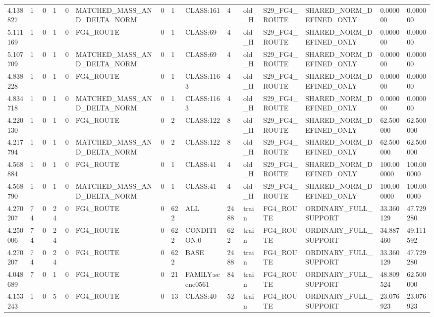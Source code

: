 \begin{tabular}{lllllllllllllll}
4.138827 & 1 & 0 & 1 & 0 & MATCHED\_MASS\_AND\_DELTA\_NORM & 0 & 1 & CLASS:161 & 4 & old\_H & S29\_FG4\_ROUTE & SHARED\_NORM\_DEFINED\_ONLY & 0.000000 & 0.000000 \\
5.111169 & 1 & 0 & 1 & 0 & FG4\_ROUTE & 0 & 1 & CLASS:69 & 4 & old\_H & S29\_FG4\_ROUTE & SHARED\_NORM\_DEFINED\_ONLY & 0.000000 & 0.000000 \\
5.107709 & 1 & 0 & 1 & 0 & MATCHED\_MASS\_AND\_DELTA\_NORM & 0 & 1 & CLASS:69 & 4 & old\_H & S29\_FG4\_ROUTE & SHARED\_NORM\_DEFINED\_ONLY & 0.000000 & 0.000000 \\
4.838228 & 1 & 0 & 1 & 0 & FG4\_ROUTE & 0 & 1 & CLASS:1163 & 4 & old\_H & S29\_FG4\_ROUTE & SHARED\_NORM\_DEFINED\_ONLY & 0.000000 & 0.000000 \\
4.834718 & 1 & 0 & 1 & 0 & MATCHED\_MASS\_AND\_DELTA\_NORM & 0 & 1 & CLASS:1163 & 4 & old\_H & S29\_FG4\_ROUTE & SHARED\_NORM\_DEFINED\_ONLY & 0.000000 & 0.000000 \\
4.220130 & 1 & 0 & 1 & 0 & FG4\_ROUTE & 0 & 2 & CLASS:122 & 8 & old\_H & S29\_FG4\_ROUTE & SHARED\_NORM\_DEFINED\_ONLY & 62.500000 & 62.500000 \\
4.217794 & 1 & 0 & 1 & 0 & MATCHED\_MASS\_AND\_DELTA\_NORM & 0 & 2 & CLASS:122 & 8 & old\_H & S29\_FG4\_ROUTE & SHARED\_NORM\_DEFINED\_ONLY & 62.500000 & 62.500000 \\
4.568884 & 1 & 0 & 1 & 0 & FG4\_ROUTE & 0 & 1 & CLASS:41 & 4 & old\_H & S29\_FG4\_ROUTE & SHARED\_NORM\_DEFINED\_ONLY & 100.000000 & 100.000000 \\
4.568790 & 1 & 0 & 1 & 0 & MATCHED\_MASS\_AND\_DELTA\_NORM & 0 & 1 & CLASS:41 & 4 & old\_H & S29\_FG4\_ROUTE & SHARED\_NORM\_DEFINED\_ONLY & 100.000000 & 100.000000 \\
4.270207 & 74 & 0 & 24 & 0 & FG4\_ROUTE & 0 & 622 & ALL & 2488 & train & FG4\_ROUTE & ORDINARY\_FULL\_SUPPORT & 33.360129 & 47.729280 \\
4.250006 & 74 & 0 & 24 & 0 & FG4\_ROUTE & 0 & 622 & CONDITION:0 & 622 & train & FG4\_ROUTE & ORDINARY\_FULL\_SUPPORT & 34.887460 & 49.111592 \\
4.270207 & 74 & 0 & 24 & 0 & FG4\_ROUTE & 0 & 622 & BASE & 2488 & train & FG4\_ROUTE & ORDINARY\_FULL\_SUPPORT & 33.360129 & 47.729280 \\
4.048689 & 7 & 0 & 1 & 0 & FG4\_ROUTE & 0 & 21 & FAMILY:scene0561 & 84 & train & FG4\_ROUTE & ORDINARY\_FULL\_SUPPORT & 48.809524 & 62.500000 \\
4.153243 & 1 & 0 & 5 & 0 & FG4\_ROUTE & 0 & 13 & CLASS:40 & 52 & train & FG4\_ROUTE & ORDINARY\_FULL\_SUPPORT & 23.076923 & 23.076923 \\

\end{tabular}
